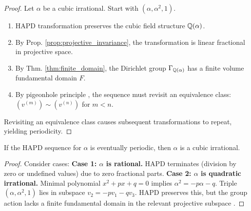 
\begin{proof}
Let $\alpha$ be a cubic irrational. Start with $(\alpha, \alpha^2, 1)$.
\begin{enumerate}
    \item HAPD transformation preserves the cubic field structure $\mathbb{Q}(\alpha)$.
    \item By Prop. \ref{prop:projective_invariance}, the transformation is linear fractional in projective space.
    \item By Thm. \ref{thm:finite_domain}, the Dirichlet group $\Gamma_{\mathbb{Q}(\alpha)}$ has a finite volume fundamental domain $F$.
    \item By pigeonhole principle \cite{Schmidt1980}, the sequence must revisit an equivalence class: $(v^{(m)}) \sim (v^{(n)})$ for $m < n$.
\end{enumerate}
Revisiting an equivalence class causes subsequent transformations to repeat, yielding periodicity.
\end{proof}

\begin{theorem}\label{thm:only_cubic_periodic}
If the HAPD sequence for $\alpha$ is eventually periodic, then $\alpha$ is a cubic irrational.
\end{theorem}

\begin{proof}
Consider cases:
\textbf{Case 1: $\alpha$ is rational.} HAPD terminates (division by zero or undefined values) due to zero fractional parts.
\textbf{Case 2: $\alpha$ is quadratic irrational.} Minimal polynomial $x^2+px+q=0$ implies $\alpha^2 = -p\alpha - q$. Triple $(\alpha, \alpha^2, 1)$ lies in subspace $v_2 = -pv_1 - qv_3$. HAPD preserves this, but the group action lacks a finite fundamental domain in the relevant projective subspace \cite{Khinchin1964}.
\end{proof}
